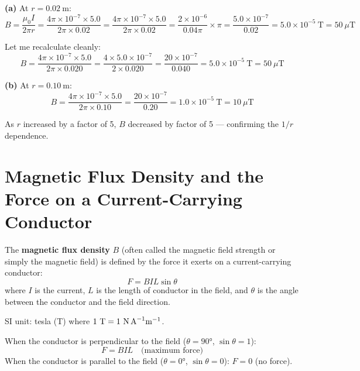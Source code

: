 \begin{solutionbox}
\textbf{(a)} At $r = 0.02\ \text{m}$:
\[
  B = \frac{\mu_0 I}{2\pi r}
  = \frac{4\pi\times10^{-7} \times 5.0}
    {2\pi \times 0.02}
  = \frac{4\pi\times10^{-7} \times 5.0}
    {2\pi \times 0.02}
  = \frac{2\times10^{-6}}{0.04\pi}\times\pi
  = \frac{5.0\times10^{-7}}{0.02}
  = 5.0\times10^{-5}\ \text{T} = 50\ \mu\text{T}
\]

Let me recalculate cleanly:
\[
  B = \frac{4\pi\times10^{-7} \times 5.0}
    {2\pi \times 0.020}
  = \frac{4 \times 5.0 \times 10^{-7}}
    {2 \times 0.020}
  = \frac{20\times10^{-7}}{0.040}
  = 5.0\times10^{-5}\ \text{T} = 50\ \mu\text{T}
\]

\textbf{(b)} At $r = 0.10\ \text{m}$:
\[
  B = \frac{4\pi\times10^{-7} \times 5.0}
    {2\pi \times 0.10}
  = \frac{20\times10^{-7}}{0.20}
  = 1.0\times10^{-5}\ \text{T} = 10\ \mu\text{T}
\]

As $r$ increased by a factor of 5, $B$ decreased by
factor of 5 --- confirming the $1/r$ dependence.
\end{solutionbox}

\section{Magnetic Flux Density and the Force on a
Current-Carrying Conductor}

\begin{definitionbox}
The \textbf{magnetic flux density} $B$ (often called
the magnetic field strength or simply the magnetic
field) is defined by the force it exerts on a
current-carrying conductor:
\[
  F = BIL\sin\theta
\]
where $I$ is the current, $L$ is the length of
conductor in the field, and $\theta$ is the angle
between the conductor and the field direction.

SI unit: tesla (T) where
$1\ \text{T} = 1\ \text{N\,A}^{-1}\text{m}^{-1}$.

When the conductor is perpendicular to the field
($\theta = 90°$, $\sin\theta = 1$):
\[
  F = BIL \quad \text{(maximum force)}
\]
When the conductor is parallel to the field
($\theta = 0°$, $\sin\theta = 0$):
$F = 0$ (no force).
\end{definitionbox}

